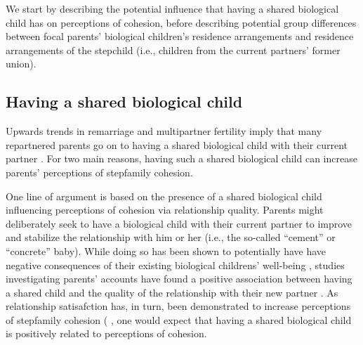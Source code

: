 \documentclass[\pandocDocMode,longtable,floatsintext]{apa6}
\begin{document}
We start by describing the potential influence that having a shared
biological child has on perceptions of cohesion, before describing
potential group differences between focal parents' biological children's
residence arrangements and residence arrangements of the stepchild
(i.e., children from the current partners' former union).

\hypertarget{having-a-shared-biological-child}{%
\subsection{Having a shared biological
child}\label{having-a-shared-biological-child}}

Upwards trends in remarriage and multipartner fertility imply that many
repartnered parents go on to having a shared biological child with their
current partner \autocite{lappegaard2018intergenerational}. For two main
reasons, having such a shared biological child can increase parents'
perceptions of stepfamily cohesion.

One line of argument is based on the presence of a shared biological
child influencing perceptions of cohesion via relationship quality.
Parents might deliberately seek to have a biological child with their
current partner to improve and stabilize the relationship with him or
her (i.e., the so-called ``cement'' or ``concrete'' baby). While doing
so has been shown to potentially have have negative consequences of
their existing biological childrens' well-being
\autocite{sanner2018half}, studies investigating parents' accounts have
found a positive association between having a shared child and the
quality of the relationship with their new partner
\autocite{ivanova2019cementing}. As relationship satisafction has, in
turn, been demonstrated to increase perceptions of stepfamily cohesion
(\autocite{jensen2022associations} \autocite{king2015adolescents}
\autocite{king2016factors}, one would expect that having a shared
biological child is positively related to perceptions of cohesion.
\end{document}
